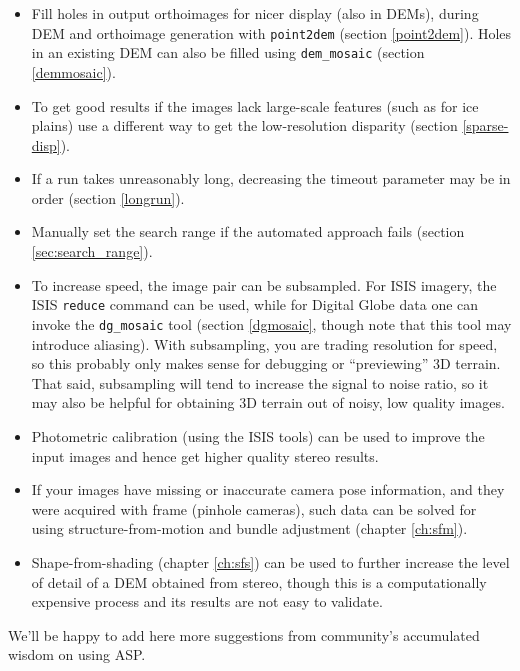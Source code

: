 \begin{itemize}
\item Fill holes in output orthoimages for nicer display (also in DEMs),
during DEM and orthoimage generation with \texttt{point2dem} (section
\ref{point2dem}). Holes in an existing DEM can also be filled using
\texttt{dem\_mosaic} (section \ref{demmosaic}).

\item To get good results if the images lack large-scale features (such
as for ice plains) use a different way to get the low-resolution
disparity (section \ref{sparse-disp}).

\item If a run takes unreasonably long, decreasing the timeout parameter
may be in order (section \ref{longrun}).

\item Manually set the search range if the automated approach fails
(section \ref{sec:search_range}).

\item To increase speed, the image pair can be subsampled. For ISIS
imagery, the ISIS \texttt{reduce} command can be used, while for Digital
Globe data one can invoke the \texttt{dg\_mosaic} tool (section
\ref{dgmosaic}, though note that this tool may introduce aliasing). With
subsampling, you are trading resolution for speed, so this probably only
makes sense for debugging or ``previewing'' 3D terrain. That said,
subsampling will tend to increase the signal to noise ratio, so it may
also be helpful for obtaining 3D terrain out of noisy, low quality
images.

\item Photometric calibration (using the ISIS tools) can be used to improve the input images
and hence get higher quality stereo results.

\item If your images have missing or inaccurate camera pose information,
and they were acquired with frame (pinhole cameras), such data can be
solved for using structure-from-motion and bundle adjustment (chapter
\ref{ch:sfm}).

\item Shape-from-shading (chapter \ref{ch:sfs}) can be used to further
increase the level of detail of a DEM obtained from stereo, though this
is a computationally expensive process and its results are not easy to
validate.

\end{itemize}

We'll be happy to add here more suggestions from community's accumulated
wisdom on using ASP.
